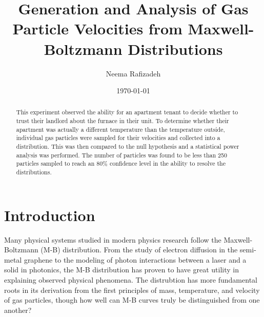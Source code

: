 \documentclass[%
 reprint,
 amsmath,amssymb,
 aps,
]{revtex4-2}
\begin{document}

\title{Generation and Analysis of Gas Particle Velocities from Maxwell-Boltzmann Distributions}%

\author{Neema Rafizadeh}
%

\date{\today}

\begin{abstract}

This experiment observed the ability for an apartment tenant to decide whether to trust their landlord about the furnace in their unit. To determine whether their apartment was actually a different temperature than the temperature outside, individual gas particles were sampled for their velocities and collected into a distribution. This was then compared to the null hypothesis and a statistical power analysis was performed. The number of particles was found to be less than 250 particles sampled to reach an 80\% confidence level in the ability to resolve the distributions. 
\end{abstract}


\maketitle


\section{Introduction \protect\\ }

Many physical systems studied in modern physics research follow the Maxwell-Boltzmann (M-B) distribution. From the study of electron diffusion in the semi-metal graphene to the modeling of photon interactions between a laser and a solid in photonics, the M-B distribution has proven to have great utility in explaining observed physical phenomena. The distrubtion has more fundamental roots in its derivation from the first principles of mass, temperature, and velocity of gas particles, though how well can M-B curves truly be distinguished from one another?  
\end{document}

